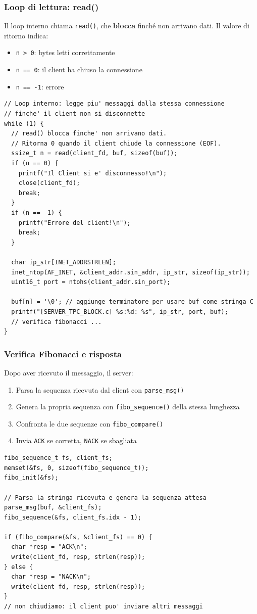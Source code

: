 \documentclass[a4paper,12pt]{article}
\begin{document}
\subsubsection{Loop di lettura: read()}
Il loop interno chiama \texttt{read()}, che \textbf{blocca} finché non arrivano dati.
Il valore di ritorno indica:
\begin{itemize}
    \item \texttt{n > 0}: bytes letti correttamente
    \item \texttt{n == 0}: il client ha chiuso la connessione
    \item \texttt{n == -1}: errore
\end{itemize}

\begin{lstlisting}[caption={server\_tcp\_block.c - read()}]
// Loop interno: legge piu' messaggi dalla stessa connessione
// finche' il client non si disconnette
while (1) {
  // read() blocca finche' non arrivano dati.
  // Ritorna 0 quando il client chiude la connessione (EOF).
  ssize_t n = read(client_fd, buf, sizeof(buf));
  if (n == 0) {
    printf("Il Client si e' disconnesso!\n");
    close(client_fd);
    break;
  }
  if (n == -1) {
    printf("Errore del client!\n");
    break;
  }

  char ip_str[INET_ADDRSTRLEN];
  inet_ntop(AF_INET, &client_addr.sin_addr, ip_str, sizeof(ip_str));
  uint16_t port = ntohs(client_addr.sin_port);

  buf[n] = '\0'; // aggiunge terminatore per usare buf come stringa C
  printf("[SERVER_TPC_BLOCK.c] %s:%d: %s", ip_str, port, buf);
  // verifica fibonacci ...
}
\end{lstlisting}
\FloatBarrier

\subsubsection{Verifica Fibonacci e risposta}
Dopo aver ricevuto il messaggio, il server:
\begin{enumerate}
    \item Parsa la sequenza ricevuta dal client con \texttt{parse\_msg()}
    \item Genera la propria sequenza con \texttt{fibo\_sequence()} della stessa lunghezza
    \item Confronta le due sequenze con \texttt{fibo\_compare()}
    \item Invia \texttt{ACK} se corretta, \texttt{NACK} se sbagliata
\end{enumerate}
\begin{lstlisting}[caption={server\_tcp\_block.c - verifica e risposta}]
fibo_sequence_t fs, client_fs;
memset(&fs, 0, sizeof(fibo_sequence_t));
fibo_init(&fs);

// Parsa la stringa ricevuta e genera la sequenza attesa
parse_msg(buf, &client_fs);
fibo_sequence(&fs, client_fs.idx - 1);

if (fibo_compare(&fs, &client_fs) == 0) {
  char *resp = "ACK\n";
  write(client_fd, resp, strlen(resp));
} else {
  char *resp = "NACK\n";
  write(client_fd, resp, strlen(resp));
}
// non chiudiamo: il client puo' inviare altri messaggi
\end{lstlisting}
\FloatBarrier
\end{document}
